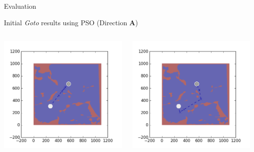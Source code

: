 \documentclass[9pt]{beamer}
\begin{document}
\begin{frame}{Evaluation}
    \begin{block}{Initial \textit{Goto} results using PSO (Direction \textbf{A})}
        \begin{columns}
            \begin{column}{0.25\textwidth}
                \begin{center}
                        \includegraphics[width=\textwidth,trim={2cm 2cm 2cm 2cm},clip]{img/EXP3RG_PathAa_-1_-1_0_0.png}
                \end{center}
            \end{column}
            \begin{column}{0.25\textwidth}
                \begin{center}
                    \includegraphics[width=\textwidth,trim={2cm 2cm 2cm 2cm},clip]{img/EXP3RG_PathAa_-1_-1_0_-1.png}

\end{center}
\end{column}
\end{columns}
\end{block}
\end{frame}
\end{document}
